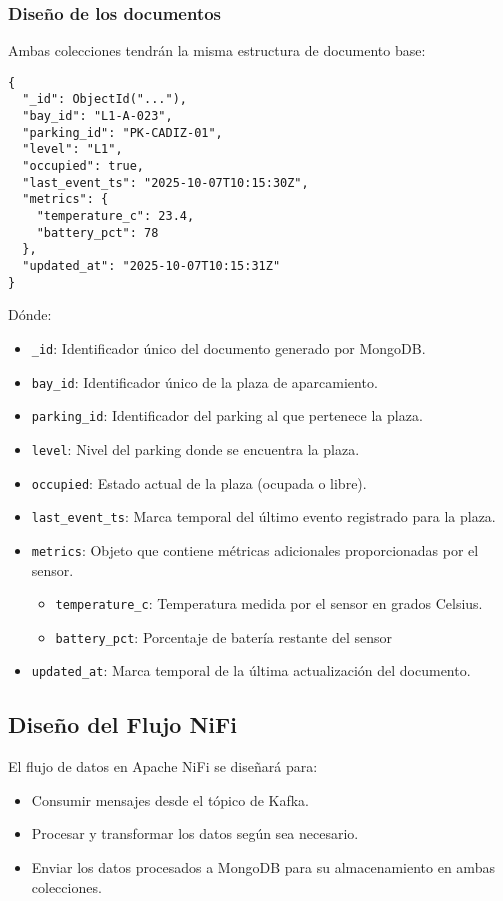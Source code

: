 \documentclass{../../../miPlantilla}
\begin{document}
\newpage

\subsubsection{Diseño de los documentos}
Ambas colecciones tendrán la misma estructura de documento base:
\begin{lstlisting}
{
  "_id": ObjectId("..."),
  "bay_id": "L1-A-023",
  "parking_id": "PK-CADIZ-01",
  "level": "L1",
  "occupied": true,
  "last_event_ts": "2025-10-07T10:15:30Z",
  "metrics": {
    "temperature_c": 23.4,
    "battery_pct": 78
  },
  "updated_at": "2025-10-07T10:15:31Z"
}
\end{lstlisting}

Dónde:
\begin{itemize}
  \item \texttt{\_id}: Identificador único del documento generado por MongoDB.
  \item \texttt{bay\_id}: Identificador único de la plaza de aparcamiento.
  \item \texttt{parking\_id}: Identificador del parking al que pertenece la plaza.
  \item \texttt{level}: Nivel del parking donde se encuentra la plaza.
  \item \texttt{occupied}: Estado actual de la plaza (ocupada o libre).
  \item \texttt{last\_event\_ts}: Marca temporal del último evento registrado para la plaza.
  \item \texttt{metrics}: Objeto que contiene métricas adicionales proporcionadas por el sensor.
  \begin{itemize}
    \item \texttt{temperature\_c}: Temperatura medida por el sensor en grados Celsius.
    \item \texttt{battery\_pct}: Porcentaje de batería restante del sensor
  \end{itemize} 
  \item \texttt{updated\_at}: Marca temporal de la última actualización del documento.
\end{itemize}

\subsection{Diseño del Flujo NiFi}
El flujo de datos en Apache NiFi se diseñará para:
\begin{itemize}
  \item Consumir mensajes desde el tópico de Kafka.
  \item Procesar y transformar los datos según sea necesario.
  \item Enviar los datos procesados a MongoDB para su almacenamiento en ambas colecciones.
\end{itemize}
\end{document}
